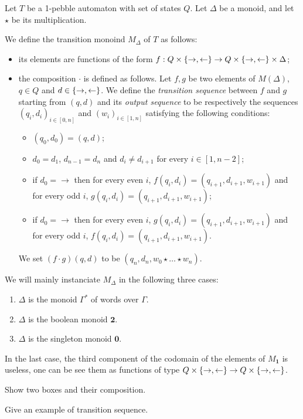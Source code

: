    
\begin{definition}%
Let $T$ be a 1-pebble automaton with set of states $Q$. Let $\Delta$ be a monoid, and let $\star$ be its multiplication.

We define the transition monoind $M_\Delta$ of $T$ as follows:
\begin{itemize}
\item its elements are functions of the form $f:Q\times\{\rightarrow,\leftarrow\}\to Q\times\{\rightarrow,\leftarrow\}\times \Delta$;
\item the composition $\cdot$ is defined as follows. Let $f, g$ be two elements of $M(\Delta)$, $q\in Q$ and $d\in\{\rightarrow, \leftarrow\}$. We define the \emph{transition sequence} between 
$f$ and $g$ starting from $(q,d)$ and its \emph{output sequence} to be respectively the sequences $(q_i,d_i)_{i\in[0,n]}$ and  $(w_i)_{i\in[1,n]}$ satisfying the following conditions: 
\begin{itemize}
\item $(q_0,d_0)=(q,d)$;
\item $d_0=d_1$, $d_{n-1}=d_{n}$ and $d_i\neq d_{i+1}$ for every $i\in[1,n-2]$;
\item if $d_0=\rightarrow$ then for every even $i$, $f(q_i,d_i)=(q_{i+1},d_{i+1}, w_{i+1})$ and for every odd $i$, $g(q_i,d_i)=(q_{i+1},d_{i+1}, w_{i+1})$;
\item if $d_0=\rightarrow$ then for every even $i$, $g(q_i,d_i)=(q_{i+1},d_{i+1}, w_{i+1})$ and for every odd $i$, $f(q_i,d_i)=(q_{i+1},d_{i+1}, w_{i+1})$. 
\end{itemize}
We set $(f\cdot g) (q,d)$ to be $(q_n, d_n, w_0\star\dots\star w_n)$.
\end{itemize}
\end{definition}
We will mainly instanciate $M_\Delta$ in the following three cases: 
\begin{enumerate}
\item $\Delta$ is the monoid $\Gamma^*$ of words over $\Gamma$.
\item $\Delta$ is the boolean monoid $\mathbf 2$.
\item $\Delta$ is the singleton monoid $\mathbf 0$.
\end{enumerate}
In the last case, the third component of the codomain of the elements of $M_{\mathbf 1}$ is useless, one can be see them as functions of type $Q\times\{\rightarrow,\leftarrow\}\to Q\times\{\rightarrow,\leftarrow\}$.

\begin{example}
\begin{center}
Show two boxes and their composition.

Give an example of transition sequence.
\end{center}
\end{example}

